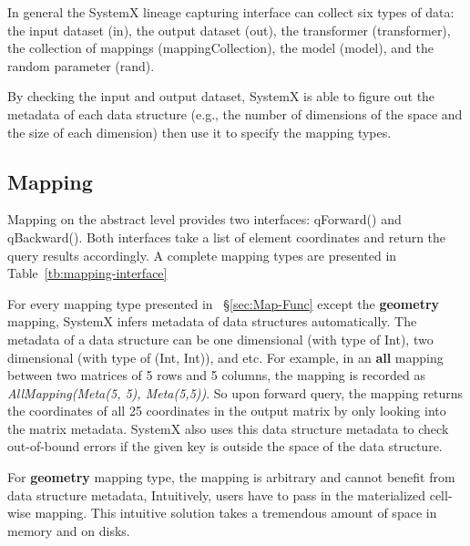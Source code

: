 \documentclass{sig-alternate}
\begin{document}
In general the SystemX lineage capturing interface can collect six types of data: 
the input dataset (in), the output dataset (out), the transformer (transformer), 
the collection of mappings (mappingCollection), the model (model), and the random 
parameter (rand).

By checking the input and output dataset, SystemX is able to figure out the metadata of each data structure 
(e.g., the number of dimensions of the space and the size of each dimension) then use it to specify the mapping types.

\subsection{Mapping}
\label{sec:Design-Mapping}
Mapping on the abstract level provides two interfaces: qForward() and qBackward(). Both interfaces
take a list of element coordinates and return the query results accordingly.
A complete mapping types are presented in Table~\ref{tb:mapping-interface}

For every mapping type presented in ~\S\ref{sec:Map-Func} except the {\bf geometry} mapping, 
SystemX infers metadata of data structures automatically. 
The metadata  of a data structure can be one dimensional (with type of Int), two dimensional (with type of (Int, Int)), and etc.
For example, in an {\bf all} mapping between two matrices of 5 rows and 5 columns,
the mapping is recorded as {\it AllMapping(Meta(5, 5), Meta(5,5))}. 
So upon forward query, the mapping returns the coordinates of all 25 coordinates in the output matrix by only looking into the matrix metadata.
SystemX also uses this data structure metadata to check out-of-bound errors if the given key is outside the space of the data structure.

For {\bf geometry} mapping type, the mapping is arbitrary and cannot benefit from data structure metadata, 
Intuitively, users have to pass in the materialized cell-wise mapping. 
This intuitive solution takes a tremendous amount of space in memory and on disks.
\end{document}
